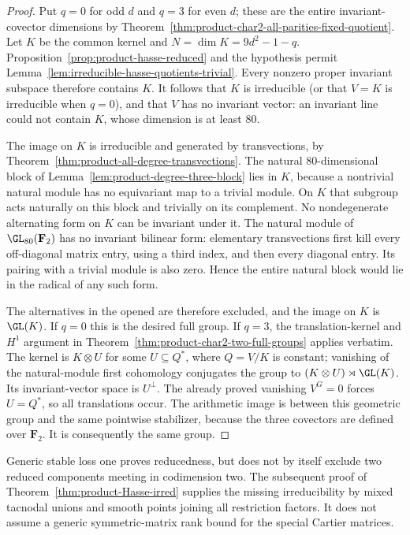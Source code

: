 \begin{proof}
Put $q=0$ for odd $d$ and $q=3$ for even $d$; these are the
entire invariant-covector dimensions by
Theorem~\ref{thm:product-char2-all-parities-fixed-quotient}.
Let $K$ be the common kernel and $N=\dim K=9d^2-1-q$.
Proposition~\ref{prop:product-hasse-reduced} and the hypothesis
permit Lemma~\ref{lem:irreducible-hasse-quotients-trivial}.
Every nonzero proper invariant subspace therefore contains $K$.
It follows that $K$ is irreducible (or that $V=K$ is irreducible
when $q=0$), and that $V$ has no invariant vector: an invariant
line could not contain $K$, whose dimension is at least $80$.

The image on $K$ is irreducible and generated by transvections,
by Theorem~\ref{thm:product-all-degree-transvections}.
The natural $80$-dimensional block of
Lemma~\ref{lem:product-degree-three-block} lies in $K$, because
a nontrivial natural module has no equivariant map to a trivial
module.  On $K$ that subgroup acts naturally on this block and
trivially on its complement.
No nondegenerate alternating form on $K$ can be invariant under
it.  The natural module of $\GL_{80}(\mathbf F_2)$ has no
invariant bilinear form: elementary transvections first kill
every off-diagonal matrix entry, using a third index, and then
every diagonal entry.  Its pairing with a trivial module is
also zero.  Hence the entire natural block would lie in the
radical of any such form.

The alternatives in the opened
\cite[Theorem~3.6, p.~22]{KantorSeress2001} are therefore excluded,
and the image on $K$ is $\GL(K)$.
If $q=0$ this is the desired full group.
If $q=3$, the translation-kernel and $H^1$ argument in
Theorem~\ref{thm:product-char2-two-full-groups} applies verbatim.
The kernel is $K\otimes U$ for some $U\subseteq Q^*$, where
$Q=V/K$ is constant; vanishing of the natural-module first
cohomology conjugates the group to
$(K\otimes U)\rtimes\GL(K)$.
Its invariant-vector space is $U^\perp$.
The already proved vanishing $V^G=0$ forces $U=Q^*$, so all
translations occur.  The arithmetic image is between this
geometric group and the same pointwise stabilizer, because the
three covectors are defined over $\mathbf F_2$.
It is consequently the same group.
\end{proof}

\begin{remark}\label{auto:A_monodromy:24716fc9b916}

Generic stable loss one proves reducedness, but does not by
itself exclude two reduced components meeting in codimension
two. The subsequent proof of
Theorem~\ref{thm:product-Hasse-irred} supplies the missing
irreducibility by mixed tacnodal unions and smooth points
joining all restriction factors. It does not assume a generic
symmetric-matrix rank bound for the special Cartier matrices.
\end{remark}


